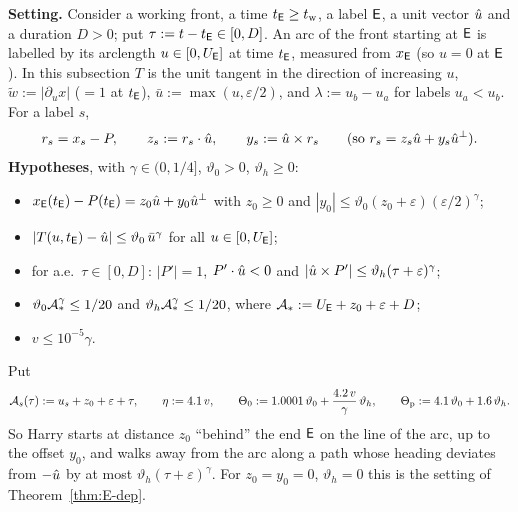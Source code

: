 \medskip\noindent\textbf{Setting.} Consider a working front, a time $t_{\mathsf E}\ge t_{\mathrm w}$, a label $\mathsf E$, a unit vector $\hat u$ and a
duration $D>0$; put $\tau:=t-t_{\mathsf E}\in[0,D]$. An arc of the front starting at $\mathsf E$ is labelled by its arclength $u\in[0,U_{\mathsf E}]$ at
time $t_{\mathsf E}$, measured from $x_{\mathsf E}$ (so $u=0$ at $\mathsf E$). In this subsection $T$ is the unit tangent in the direction of increasing
$u$, $\tilde w:=|\partial_ux|$ ($=1$ at $t_{\mathsf E}$), $\bar u:=\max(u,\varepsilon/2)$, and $\lambda:=u_b-u_a$ for labels $u_a<u_b$.
For a label $s$,
\[
r_s=x_s-P,\qquad z_s:=r_s\cdot\hat u,\qquad y_s:=\hat u\times r_s\qquad(\text{so }r_s=z_s\hat u+y_s\hat u^\perp).
\]
\textbf{Hypotheses}, with $\gamma\in(0,1/4]$, $\vartheta_0>0$, $\vartheta_h\ge0$:
\begin{itemize}
\item[(Q0)] $x_{\mathsf E}(t_{\mathsf E})-P(t_{\mathsf E})=z_0\hat u+y_0\hat u^\perp$ with $z_0\ge0$ and
$|y_0|\le\vartheta_0(z_0+\varepsilon)(\varepsilon/2)^\gamma$;
\item[(Q1)] $|T(u,t_{\mathsf E})-\hat u|\le\vartheta_0\,\bar u^\gamma$ for all $u\in[0,U_{\mathsf E}]$;
\item[(Q2)] for a.e.\ $\tau\in[0,D]$: $|P'|=1$, $P'\cdot\hat u<0$ and $|\hat u\times P'|\le\vartheta_h(\tau+\varepsilon)^\gamma$;
\item[(Q3)] $\vartheta_0\mathcal A_*^\gamma\le1/20$ and $\vartheta_h\mathcal A_*^\gamma\le1/20$, where $\mathcal A_*:=U_{\mathsf E}+z_0+\varepsilon+D$;
\item[(Q4)] $v\le10^{-5}\gamma$.
\end{itemize}
Put
\[
\mathcal A_s(\tau):=u_s+z_0+\varepsilon+\tau,\qquad\eta:=4.1\,v,\qquad\Theta_0:=1.0001\,\vartheta_0+\frac{4.2\,v}\gamma\,\vartheta_h,
\qquad\Theta_{\mathrm p}:=4.1\,\vartheta_0+1.6\,\vartheta_h .
\]
So Harry starts at distance $z_0$ ``behind'' the end $\mathsf E$ on the line of the arc, up to the offset $y_0$, and walks away from the
arc along a path whose heading deviates from $-\hat u$ by at most $\vartheta_h(\tau+\varepsilon)^\gamma$. For $z_0=y_0=0$,
$\vartheta_h=0$ this is the setting of Theorem~\ref{thm:E-dep}.

